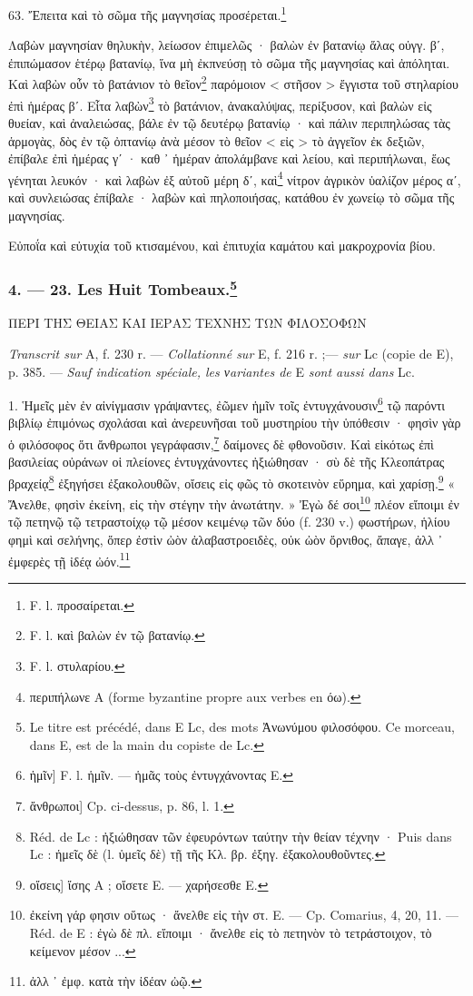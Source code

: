 \documentclass[a4paper, 11pt, oneside, polutonikogreek, french]{article}
\begin{document}
63. Ἔπειτα καὶ τὸ σῶμα τῆς μαγνησίας προσέρεται.\footnote{F. l. προσαίρεται.}

Λαβὼν μαγνησίαν θηλυκὴν, λείωσον ἐπιμελῶς · βαλὼν ἐν βατανίῳ ἅλας οὐγγ. βʹ, ἐπιπώμασον ἑτέρῳ βατανίῳ, ἵνα μὴ ἐκπνεύσῃ τὸ σῶμα τῆς μαγνησίας καὶ ἀπόληται. Καὶ λαβὼν οὖν τὸ βατάνιον τὸ θεῖον\footnote{F. l. καὶ βαλὼν ἐν τῷ βατανίῳ.} παρόμοιον < στῆσον > ἔγγιστα τοῦ στηλαρίου ἐπὶ ἡμέρας βʹ. Εἶτα λαβὼν\footnote{F. l. στυλαρίου.} τὸ βατάνιον, ἀνακαλύψας, περίξυσον, καὶ βαλὼν εἰς θυείαν, καὶ ἀναλειώσας, βάλε ἐν τῷ δευτέρῳ βατανίῳ · καὶ πάλιν περιπηλώσας τὰς ἁρμογὰς, δὸς ἐν τῷ ὀπτανίῳ ἀνὰ μέσον τὸ θεῖον < εἰς > τὸ ἀγγεῖον ἐκ δεξιῶν, ἐπίβαλε ἐπὶ ἡμέρας γʹ · καθ ᾽ ἡμέραν ἀπολάμβανε καὶ λείου, καὶ περιπήλωναι, ἕως γένηται λευκόν · καὶ λαβὼν ἐξ αὐτοῦ μέρη δʹ, καὶ\footnote{περιπήλωνε A (forme byzantine propre aux verbes en όω).} νίτρον ἀγρικὸν ὑαλίζον μέρος αʹ, καὶ συνλειώσας ἐπίβαλε · λαβὼν καὶ πηλοποιήσας, κατάθου ἐν χωνείῳ τὸ σῶμα τῆς μαγνησίας.

Εὐποΐα καὶ εὐτυχία τοῦ κτισαμένου, καὶ ἐπιτυχία καμάτου καὶ μακροχρονία βίου.

\bigskip
\centerline{\EightStarTaper}
\centerline{\EightStarTaper\EightStarTaper}
\bigskip

\subsubsection[4. --- 23. Les Huit Tombeaux.]{4. --- 23. Les Huit Tombeaux.\footnote{Le titre est précédé, dans E Lc, des mots Ἀνωνύμου φιλοσόφου. Ce morceau, dans E, est de la main du copiste de Lc.}}

ΠΕΡΙ ΤΗΣ ΘΕΙΑΣ ΚΑΙ ΙΕΡΑΣ ΤΕΧΝΗΣ ΤΩΝ ΦΙΛΟΣΟΦΩΝ

\emph{Transcrit sur} A, f. 230 r. --- \emph{Collationné sur} E, f. 216 r. ;--- \emph{sur} Lc (copie de E), p. 385. --- \emph{Sauf indication spéciale, les νariantes de} E \emph{sont aussi dans} Lc.

1. Ἡμεῖς μὲν ἐν αἰνίγμασιν γράψαντες, ἐῶμεν ἡμῖν τοῖς ἐντυγχάνουσιν\footnote{ἡμῖν] F. l. ἡμῖν. --- ἡμᾶς τοὺς ἐντυγχάνοντας E.} τῷ παρόντι βιβλίῳ ἐπιμόνως σχολάσαι καὶ ἀνερευνῆσαι τοῦ μυστηρίου τὴν ὑπόθεσιν · φησὶν γὰρ ὁ φιλόσοφος ὅτι ἄνθρωποι γεγράφασιν,\footnote{ἄνθρωποι] Cp. ci-dessus, p. 86, l. 1.} δαίμονες δὲ φθονοῦσιν. Καὶ εἰκότως ἐπὶ βασιλείας οὐράνων οἱ πλείονες ἐντυγχάνοντες ἠξιώθησαν · σὺ δὲ τῆς Κλεοπάτρας βραχείᾳ\footnote{Réd. de Lc : ἠξιώθησαν τῶν ἐφευρόντων ταύτην τὴν θείαν τέχνην · Puis dans Lc : ἡμεῖς δὲ (l. ὑμεῖς δὲ) τῇ τῆς Κλ. βρ. ἐξηγ. ἐξακολουθοῦντες.} ἐξηγήσει ἐξακολουθῶν, οἴσεις εἰς φῶς τὸ σκοτεινὸν εὕρημα, καὶ χαρίσῃ.\footnote{οἴσεις] ἴσης A ; οἴσετε E. --- χαρήσεσθε E.} « Ἄνελθε, φησὶν ἐκείνη, εἰς τὴν στέγην τὴν ἀνωτάτην. » Ἐγὼ δέ σοι\footnote{ἐκείνη γάρ φησιν οὕτως · ἄνελθε εἰς τὴν στ. E. --- Cp. Comarius, 4, 20, 11. --- Réd. de E : ἐγὼ δὲ πλ. εἴποιμι · ἄνελθε εἰς τὸ πετηνὸν τὸ τετράστοιχον, τὸ κείμενον μέσον ...} πλέον εἴποιμι ἐν τῷ πετηνῷ τῷ τετραστοίχῳ τῷ μέσον κειμένῳ τῶν δύο (f. 230 v.) φωστήρων, ἡλίου φημὶ καὶ σελήνης, ὅπερ ἐστὶν ὠὸν ἀλαβαστροειδὲς, οὐκ ὠὸν ὄρνιθος, ἄπαγε, ἀλλ ᾽ ἐμφερὲς τῇ ἰδέᾳ ὠόν.\footnote{ἀλλ ᾽ ἐμφ. κατὰ τὴν ἰδέαν ὠῷ.}
\end{document}
